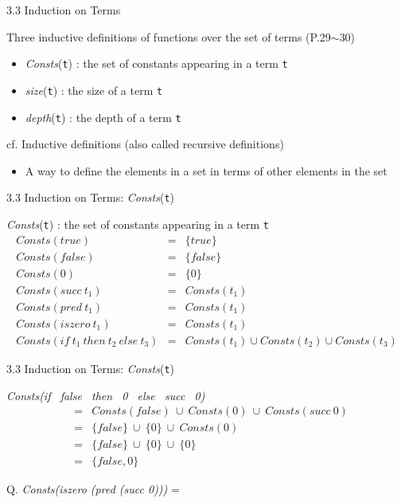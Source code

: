 \documentclass[table]{beamer}
\begin{document}
\begin{frame}[t]{3.3 Induction on Terms} \vspace{10pt}

Three inductive definitions of functions over the set of terms (P.29$\sim$30)
\begin{itemize}
\item \textit{Consts}(\texttt{t}) : the set of constants appearing in a term \texttt{t}
\item \textit{size}(\texttt{t}) : the size of a term \texttt{t}
\item \textit{depth}(\texttt{t}) : the depth of a term \texttt{t}
\end{itemize}

\vspace{10pt}

cf. Inductive definitions (also called recursive definitions)
\begin{itemize}
\item A way to define the elements in a set in terms of other elements in the set
\end{itemize}

\end{frame}

\begin{frame}[t]{3.3 Induction on Terms: \textit{Consts}(\texttt{t})} \vspace{10pt}

\textit{Consts}(\texttt{t}) : the set of constants appearing in a term \texttt{t}
\begin{eqnarray*}
Consts(true) &=& \{true\} \\
Consts(false) &=& \{false\} \\
Consts(0) &=& \{0\} \\
Consts(succ \ t_1) &=& Consts(t_1) \\
Consts(pred \ t_1) &=& Consts(t_1) \\
Consts(iszero \ t_1) &=& Consts(t_1) \\
Consts(if \ t_1 \ then  \ t_2 \ else  \ t_3) &=& Consts(t_1)\cup Consts(t_2)\cup Consts(t_3)
\end{eqnarray*}

\end{frame}

\begin{frame}[t]{3.3 Induction on Terms: \textit{Consts}(\texttt{t})}

\textit{Consts(if \ false \ then \ 0 \ else \ succ \ 0)}
\begin{eqnarray*}
 &=& Consts(false) \ \cup \ Consts(0) \ \cup \ Consts(succ \ 0) \\
 &=& \{false\} \ \cup \ \{0\} \ \cup \ Consts(0) \\ 
 &=& \{false\} \ \cup \ \{0\} \ \cup \ \{0\} \\ 
 &=& \{false,0\}   
\end{eqnarray*}

\vspace{10pt}

Q. \textit{Consts(iszero (pred (succ 0)))} = 

\end{frame}
\end{document}
